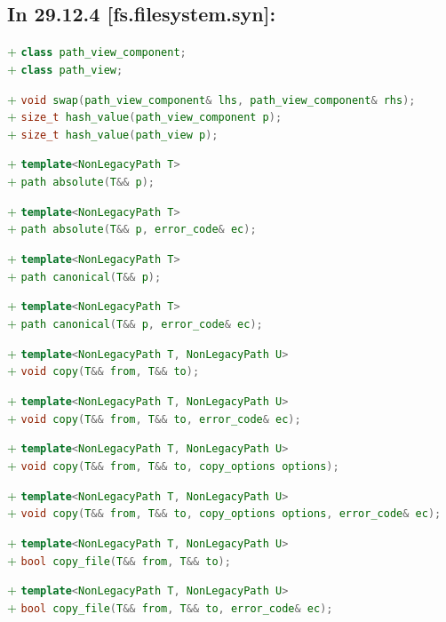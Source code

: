 \documentclass[11pt]{article}
\newcommand{\code}[2][cpp]{\lstinline[language=#1,basicstyle=\small\ttfamily]{#2}}
\newcommand{\tsref}[2]{\subsection*{In #2 \textbf{[#1]}:}}
\newcommand{\tsreplace}[3]{\textcolor{red}{\sout{#1}}#2\textcolor{darkgreen}{#3}}
\begin{document}
\tsref{fs.filesystem.syn}{29.12.4}

\tsreplace{}{}{+ \code{class path_view_component;}}\\
\tsreplace{}{}{+ \code{class path_view;}}

\tsreplace{}{}{+ \code{void swap(path_view_component& lhs, path_view_component& rhs);}}\\
\tsreplace{}{}{+ \code{size_t hash_value(path_view_component p);}}\\
\tsreplace{}{}{+ \code{size_t hash_value(path_view p);}}

\tsreplace{}{}{+ \code{template<NonLegacyPath T>}}\\
\tsreplace{}{}{+ \code{path absolute(T&& p);}}

\tsreplace{}{}{+ \code{template<NonLegacyPath T>}}\\
\tsreplace{}{}{+ \code{path absolute(T&& p, error_code& ec);}}

\tsreplace{}{}{+ \code{template<NonLegacyPath T>}}\\
\tsreplace{}{}{+ \code{path canonical(T&& p);}}

\tsreplace{}{}{+ \code{template<NonLegacyPath T>}}\\
\tsreplace{}{}{+ \code{path canonical(T&& p, error_code& ec);}}

\tsreplace{}{}{+ \code{template<NonLegacyPath T, NonLegacyPath U>}}\\
\tsreplace{}{}{+ \code{void copy(T&& from, T&& to);}}

\tsreplace{}{}{+ \code{template<NonLegacyPath T, NonLegacyPath U>}}\\
\tsreplace{}{}{+ \code{void copy(T&& from, T&& to, error_code& ec);}}

\tsreplace{}{}{+ \code{template<NonLegacyPath T, NonLegacyPath U>}}\\
\tsreplace{}{}{+ \code{void copy(T&& from, T&& to, copy_options options);}}

\tsreplace{}{}{+ \code{template<NonLegacyPath T, NonLegacyPath U>}}\\
\tsreplace{}{}{+ \code{void copy(T&& from, T&& to, copy_options options, error_code& ec);}}

\tsreplace{}{}{+ \code{template<NonLegacyPath T, NonLegacyPath U>}}\\
\tsreplace{}{}{+ \code{bool copy_file(T&& from, T&& to);}}

\tsreplace{}{}{+ \code{template<NonLegacyPath T, NonLegacyPath U>}}\\
\tsreplace{}{}{+ \code{bool copy_file(T&& from, T&& to, error_code& ec);}}
\end{document}
